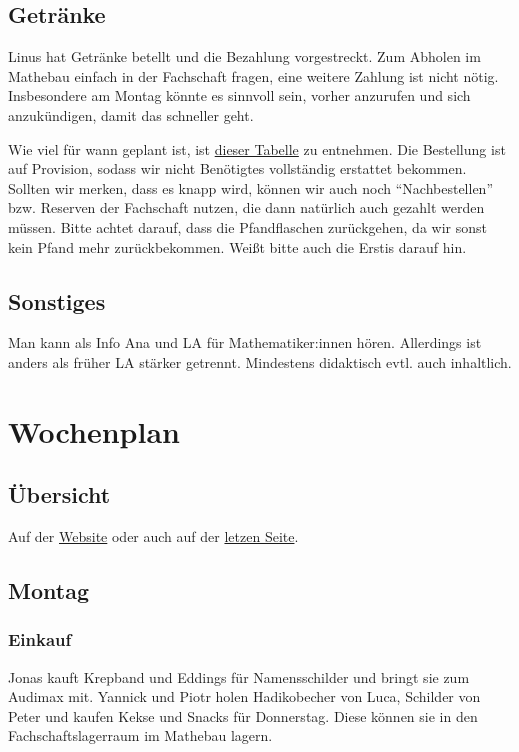 \documentclass[10pt,ngerman]{scrartcl}
\begin{document}
\begin{multicols}{2}
\subsection{Getränke}\label{drinks}

Linus hat Getränke betellt und die Bezahlung vorgestreckt.
Zum Abholen im Mathebau einfach in der Fachschaft fragen, eine weitere Zahlung ist nicht nötig.
Insbesondere am Montag könnte es sinnvoll sein, vorher anzurufen und sich anzukündigen, damit das schneller geht.

Wie viel für wann geplant ist, ist \href{https://docs.google.com/spreadsheets/d/1p1hiGPHs2fquxRcn8Yz74vaicJAu-LVF3NOmNHuNc6g/edit?usp=sharing}{dieser Tabelle} zu entnehmen.
Die Bestellung ist auf Provision, sodass wir nicht Benötigtes vollständig erstattet bekommen.
Sollten wir merken, dass es knapp wird, können wir auch noch ``Nachbestellen'' bzw. Reserven der Fachschaft nutzen, die dann natürlich auch gezahlt werden müssen.
Bitte achtet darauf, dass die Pfandflaschen zurückgehen, da wir sonst kein Pfand mehr zurückbekommen.
Weißt bitte auch die Erstis darauf hin.

\subsection{Sonstiges}

Man kann als Info Ana und LA für Mathematiker:innen hören. Allerdings ist
anders als früher LA stärker getrennt. Mindestens didaktisch evtl. auch
inhaltlich.

\section{Wochenplan}

\subsection{Übersicht}

Auf der \href{https://studierlangsam.de/wochenplan}{Website} oder auch auf der \hyperref[LastPage]{letzen Seite}.


\subsection{Montag}


\subsubsection{Einkauf}
Jonas kauft Krepband und Eddings für Namensschilder und bringt sie zum Audimax
mit.
Yannick und Piotr holen Hadikobecher von Luca, Schilder von Peter und kaufen Kekse und Snacks für Donnerstag. Diese können sie in den Fachschaftslagerraum im Mathebau lagern.


\end{multicols}
\end{document}
